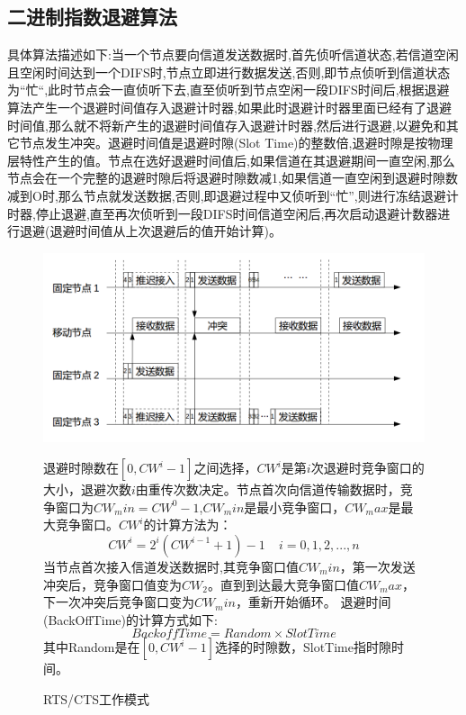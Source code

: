 \subsection{二进制指数退避算法}
具体算法描述如下:当一个节点要向信道发送数据时,首先侦听信道状态,若信道空闲且空闲时间达到一个DIFS时,节点立即进行数据发送,否则,即节点侦听到信道状态为“忙“,此时节点会一直侦听下去,直至侦听到节点空闲一段DIFS时间后,根据退避算法产生一个退避时间值存入退避计时器,如果此时退避计时器里面已经有了退避时间值,那么就不将新产生的退避时间值存入退避计时器,然后进行退避,以避免和其它节点发生冲突。退避时间值是退避时隙(Slot Time)的整数倍,退避时隙是按物理层特性产生的值。节点在选好退避时间值后,如果信道在其退避期间一直空闲,那么节点会在一个完整的退避时隙后将退避时隙数减1,如果信道一直空闲到退避时隙数减到O时,那么节点就发送数据,否则,即退避过程中又侦听到“忙”,则进行冻结退避计时器,停止退避,直至再次侦听到一段DIFS时间信道空闲后,再次启动退避计数器进行退避(退避时间值从上次退避后的值开始计算)。
\begin{figure}[ht]
	\centering
	\includegraphics[scale=0.4]{figures/backoff.png}
	\caption{
		RTS/CTS工作模式
	}
	\label{fig:example}
	
退避时隙数在$[0,CW^i-1]$之间选择，$CW^i$是第$i$次退避时竞争窗口的大小，退避次数$i$由重传次数决定。节点首次向信道传输数据时，竞争窗口为$CW_min=CW^0-1$,$CW_min$是最小竞争窗口，$CW_max$是最大竞争窗口。$CW^i$的计算方法为：
\begin{equation}
CW^i=2^i(CW^{i-1}+1)-1\ \ \ \  \ i=0,1,2,...,n
\end{equation}
当节点首次接入信道发送数据时,其竞争窗口值$CW_min$，第一次发送冲突后，竞争窗口值变为$CW_2$。直到到达最大竞争窗口值$CW_max$，下一次冲突后竞争窗口变为$CW_min$，重新开始循环。
退避时间(BackOffTime)的计算方式如下:
\begin{equation}
BackoffTime = Random \times SlotTime
\end{equation}
其中Random是在$[0,CW^i-1]$选择的时隙数，SlotTime指时隙时间。
\end{figure}
